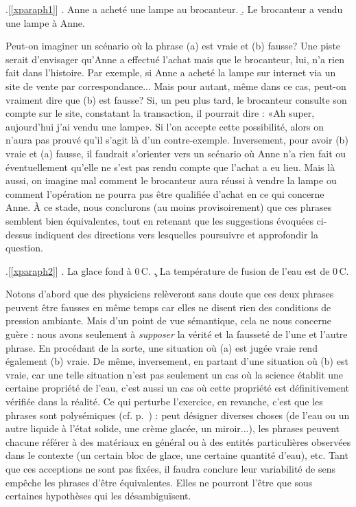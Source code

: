 \begin{refsegment}
\begin{exo}
\begin{solu}
\ex.[\ref{xparaph1}]
\a.  Anne a acheté une lampe au brocanteur.
\b. Le brocanteur a vendu une lampe à Anne.

Peut-on imaginer un scénario où la phrase (a) est vraie et (b) fausse? 
Une piste serait d'envisager qu'Anne a effectué l'achat mais que le brocanteur, lui, n'a rien fait dans l'histoire.  Par exemple, si Anne a acheté la lampe sur internet via un site de vente par correspondance... Mais pour autant, même dans ce cas, peut-on vraiment dire que (b) est fausse?  Si, un peu plus tard, le brocanteur consulte son compte sur le site, constatant la transaction, il pourrait dire : «Ah super, aujourd'hui j'ai vendu une lampe».  Si l'on accepte cette possibilité, alors on n'aura pas prouvé qu'il s'agit là d'un contre-exemple. Inversement, pour avoir (b) vraie et (a) fausse, il faudrait s'orienter vers un scénario où Anne n'a rien fait ou éventuellement qu'elle ne s'est pas rendu compte que l'achat a eu lieu. Mais là aussi, on imagine mal comment le brocanteur aura réussi à vendre la lampe ou comment l'opération ne pourra pas être qualifiée d'achat en ce qui concerne Anne. À ce stade, nous conclurons (au moins provisoirement) que ces phrases semblent bien équivalentes, tout en retenant que les suggestions évoquées ci-dessus indiquent des directions vers lesquelles poursuivre et approfondir la question. 

\ex.[\ref{xparaph2}]
\a.  La glace  fond à 0\,\degres C.
\c. La température de fusion de l'eau est de 0\,\degres C.

Notons d'abord que des physiciens relèveront sans doute que ces deux phrases peuvent être fausses en même temps car elles ne disent rien des conditions de pression ambiante.  Mais d'un point de vue sémantique, cela ne nous concerne guère : nous avons seulement à \emph{supposer} la vérité et la fausseté de l'une et l'autre phrase.  En procédant de la sorte, une situation où (a) est jugée vraie rend également (b) vraie.  De même, inversement, en partant d'une situation où (b) est vraie, car une telle situation n'est pas seulement un cas où la science établit une certaine propriété de l'eau, c'est aussi un cas où cette propriété est définitivement vérifiée dans la réalité.  Ce qui perturbe l'exercice, en revanche, c'est que les phrases sont polysémiques (cf. p.~\pageref{p.polysem}) :  peut désigner diverses choses (de l'eau ou un autre liquide à l'état solide, une crème glacée, un miroir...), les phrases peuvent chacune référer à des matériaux en général ou à des entités particulières observées dans le contexte (un certain bloc de glace, une certaine quantité d'eau), etc. Tant que ces acceptions ne sont pas fixées, il faudra conclure leur variabilité de sens empêche les phrases d'être équivalentes.  Elles ne pourront l'être que sous certaines hypothèses qui les désambiguïsent.



\end{solu}
\end{exo}
\end{refsegment}
